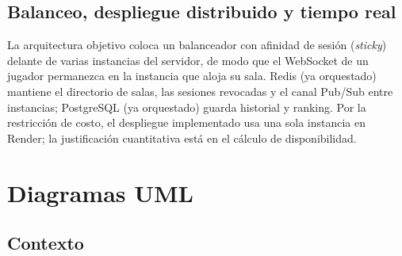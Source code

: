 \documentclass[11pt,a4paper]{article}
\begin{document}
\subsection{Balanceo, despliegue distribuido y tiempo real}
La arquitectura objetivo coloca un balanceador con afinidad de sesión
(\emph{sticky}) delante de varias instancias del servidor, de modo que el
WebSocket de un jugador permanezca en la instancia que aloja su sala. Redis
(ya orquestado) mantiene el directorio de salas, las sesiones revocadas y el
canal Pub/Sub entre instancias; PostgreSQL (ya orquestado) guarda historial
y ranking. Por la restricción de costo, el despliegue implementado usa una
sola instancia en Render; la justificación cuantitativa está en el cálculo
de disponibilidad.

\section{Diagramas UML}
\subsection{Contexto}
\begin{center}
\end{center}
\end{document}
